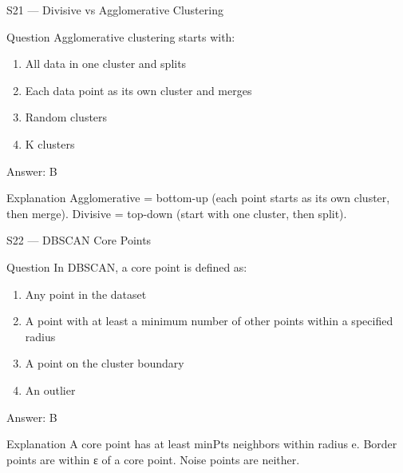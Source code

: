\documentclass[aspectratio=169,8pt]{beamer}
\begin{document}
	\begin{frame}{S21 --- Divisive vs Agglomerative Clustering}
		\begin{block}{Question}
			Agglomerative clustering starts with:
			\begin{enumerate}
				\item All data in one cluster and splits
				\item Each data point as its own cluster and merges
				\item Random clusters
				\item K clusters
			\end{enumerate}
		\end{block}
		\begin{exampleblock}{Answer: B}\end{exampleblock}
		\begin{block}{Explanation}
			Agglomerative = bottom-up (each point starts as its own cluster, then merge). Divisive = top-down (start with one cluster, then split).
		\end{block}
	\end{frame}
	
	\begin{frame}{S22 --- DBSCAN Core Points}
		\begin{block}{Question}
			In DBSCAN, a core point is defined as:
			\begin{enumerate}
				\item Any point in the dataset
				\item A point with at least a minimum number of other points within a specified radius
				\item A point on the cluster boundary
				\item An outlier
			\end{enumerate}
		\end{block}
		\begin{exampleblock}{Answer: B}\end{exampleblock}
		\begin{block}{Explanation}
			A core point has at least minPts neighbors within radius e. Border points are within ε of a core point. Noise points are neither.
		\end{block}
	\end{frame}
	
\end{document}
